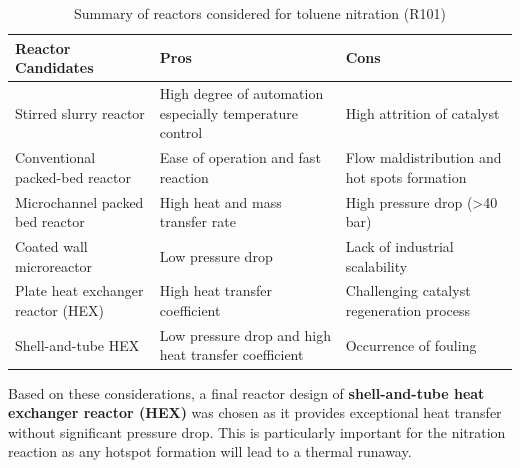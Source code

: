 \begin{table}[H]
\caption{Summary of reactors considered for toluene nitration (R101)}
\label{tab:reactorchoices}
\begin{tabularx}{\linewidth}{@{}lXX@{}}
\toprule
\textbf{Reactor Candidates}                 & \textbf{Pros}                                                                                               & \textbf{Cons}                                                                                    \\ \midrule
Stirred slurry reactor    & High degree of automation especially temperature control & High attrition of catalyst                                                              \\
Conventional packed-bed reactor    & Ease of operation and fast reaction                                                                & Flow maldistribution and hot spots formation \\
Microchannel packed bed reactor    & High heat and mass transfer rate                                                                   & High pressure drop (\textgreater{}40 bar)                                               \\
Coated wall microreactor           & Low pressure drop                                                                                  & Lack of industrial scalability                                                          \\
Plate heat exchanger reactor (HEX) & High heat transfer coefficient                                                                     & Challenging catalyst regeneration process     \\
Shell-and-tube HEX                 & Low pressure drop and high heat transfer coefficient     & Occurrence of fouling                                                                                      \\ \bottomrule
\end{tabularx}
\end{table}

Based on these considerations, a final reactor design of  \textbf{shell-and-tube heat exchanger reactor (HEX) }was chosen as it provides exceptional heat transfer without significant pressure drop. This is particularly important for the nitration reaction as any hotspot formation will lead to a thermal runaway. 

